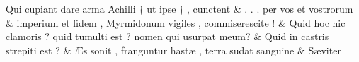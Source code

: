 \documentclass[12pt,onecolumn,twoside,a4paper]{memoir}
\begin{document}
\begin{pairs}
\begin{Leftside}
                              Qui
                              cupiant
                              dare
                              arma
                              Achilli
                              †
                              ut
                              ipse
                              †
                              ,
                              cunctent \&
                         \stanza {}.
                              .
                              .
                              per
                              vos
                              et
                              vostrorum & 
                     imperium
                              et
                              fidem
                              ,
                              Myrmidonum
                              vigiles
                              ,
                              commiserescite
                              ! \&
                         \stanza {}
                     Quid
                              hoc
                              hic
                              clamoris
                              ?
                              quid
                              tumulti
                              est
                              ?
                              nomen
                              qui
                              usurpat
                              meum? \&
                         \stanza {}
                     Quid
                              in
                              castris
                              strepiti
                              est
                              ? \&
                         \stanza {}
                     Æs
                              sonit
                              ,
                              franguntur
                              hastæ
                              ,
                              terra
                              sudat
                              sanguine \&
                         \stanza {}
                     Sæviter

\end{Leftside}
\end{pairs}
\end{document}
